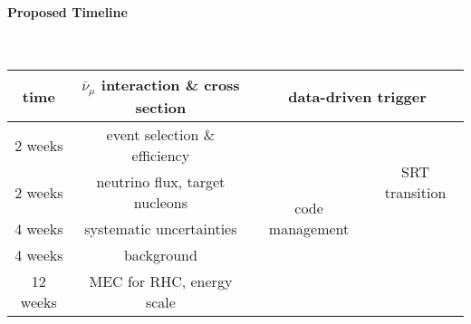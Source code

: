 \documentclass[a4paper, 11pt]{article} %
\begin{document}
\paragraph{\textbf{Proposed Timeline}}\hspace*{\fill}\\

\begin{table}[!htbp]
  \centering
  \begin{tabular}{|c|c|c|c|}
    \hline
    time & $\bar{\nu}_\mu$ interaction \& cross section & \multicolumn{2}{c|}{data-driven trigger} \\
    \hline
    2 weeks & event selection \& efficiency & \multirow{5}{*}{code management} & \multirow{3}{*}{SRT transition} \\
    \hhline{--~~}
    2 weeks & neutrino flux, target nucleons & & \\
    \hhline{--~~}
    4 weeks & systematic uncertainties & & \\
    \hhline{--~-}
    4 weeks & background & & \\
    \hhline{--~}
    12 weeks & MEC for RHC, energy scale & & \\
	\hline
  \end{tabular}
  \label{T:peak}
\end{table}






\end{document}
